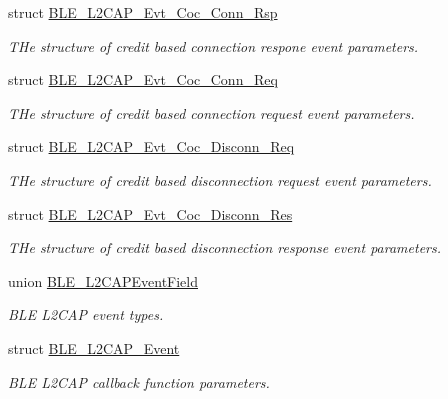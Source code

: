 \begin{DoxyCompactItemize}
struct \hyperlink{struct_b_l_e___l2_c_a_p___evt___coc___conn___rsp}{B\+L\+E\+\_\+\+L2\+C\+A\+P\+\_\+\+Evt\+\_\+\+Coc\+\_\+\+Conn\+\_\+\+Rsp}
\begin{DoxyCompactList}\small\item\em T\+He structure of credit based connection respone event parameters. \end{DoxyCompactList}\item 
struct \hyperlink{struct_b_l_e___l2_c_a_p___evt___coc___conn___req}{B\+L\+E\+\_\+\+L2\+C\+A\+P\+\_\+\+Evt\+\_\+\+Coc\+\_\+\+Conn\+\_\+\+Req}
\begin{DoxyCompactList}\small\item\em T\+He structure of credit based connection request event parameters. \end{DoxyCompactList}\item 
struct \hyperlink{struct_b_l_e___l2_c_a_p___evt___coc___disconn___req}{B\+L\+E\+\_\+\+L2\+C\+A\+P\+\_\+\+Evt\+\_\+\+Coc\+\_\+\+Disconn\+\_\+\+Req}
\begin{DoxyCompactList}\small\item\em T\+He structure of credit based disconnection request event parameters. \end{DoxyCompactList}\item 
struct \hyperlink{struct_b_l_e___l2_c_a_p___evt___coc___disconn___res}{B\+L\+E\+\_\+\+L2\+C\+A\+P\+\_\+\+Evt\+\_\+\+Coc\+\_\+\+Disconn\+\_\+\+Res}
\begin{DoxyCompactList}\small\item\em T\+He structure of credit based disconnection response event parameters. \end{DoxyCompactList}\item 
union \hyperlink{union_b_l_e___l2_c_a_p_event_field}{B\+L\+E\+\_\+\+L2\+C\+A\+P\+Event\+Field}
\begin{DoxyCompactList}\small\item\em B\+LE L2\+C\+AP event types. \end{DoxyCompactList}\item 
struct \hyperlink{struct_b_l_e___l2_c_a_p___event}{B\+L\+E\+\_\+\+L2\+C\+A\+P\+\_\+\+Event}
\begin{DoxyCompactList}\small\item\em B\+LE L2\+C\+AP callback function parameters. \end{DoxyCompactList}\end{DoxyCompactItemize}
